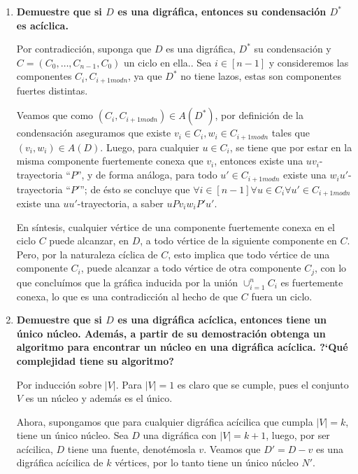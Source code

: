 \documentclass{article}
\begin{document}
\begin{enumerate}
  \item \textbf{Demuestre que si $D$ es una digr\'afica, entonces su
    condensaci\'on $D^\ast$ es ac\'iclica.}

    Por contradicci\'on, suponga que $D$ es una digr\'afica, $D^\ast$ su condensaci\'on y $C=(C_0,\dots,C_{n-1},C_0)$ un ciclo en ella.. Sea $i\in[n-1]$ y consideremos las componentes $C_i,C_{i+1 mod n}$, ya que $D^\ast$ no tiene lazos, estas son componentes fuertes distintas.

    Veamos que como $(C_i, C_{i+1 modn})\in A(D^\ast)$, por definici\'on de la condensaci\'on aseguramos que existe $v_i\in C_i, w_i\in C_{i+1 modn}$ tales que $(v_i,w_i)\in A(D)$. Luego, para cualquier $u\in C_i$, se tiene que por estar en la misma componente fuertemente conexa que $v_i$, entonces existe una $uv_i$-trayectoria ``$P$'', y de forma an\'aloga, para todo $u'\in C_{i+1 modn}$ existe una $w_iu'$-trayectoria ``$P'$''; de \'esto se concluye que $\forall i\in[n-1]\forall u\in C_i \forall u'\in C_{i+1 modn}$ existe una $uu'$-trayectoria, a saber $uPv_iw_iP'u'$.

  En s\'intesis, cualquier v\'ertice de una componente fuertemente conexa en el ciclo $C$ puede alcanzar, en $D$, a todo v\'ertice de la siguiente componente en $C$. Pero, por la naturaleza c\'iclica de $C$, esto implica que todo v\'ertice de una componente $C_i$, puede alcanzar a todo v\'ertice de otra componente $C_j$, con lo que conclu\'imos que la gr\'afica inducida por la uni\'on $\cup_{i=1}^nC_i$ es fuertemente conexa, lo que es una contradicci\'on al hecho de que $C$ fuera un ciclo.

  \item \textbf{Demuestre que si $D$ es una digr\'afica ac\'iclica, entonces
    tiene un \'unico n\'ucleo.   Adem\'as, a partir de su demostraci\'on
    obtenga un algoritmo para encontrar un n\'ucleo en una digr\'afica
    ac\'iclica.   ?`Qu\'e complejidad tiene su algoritmo?}

    Por inducci\'on sobre $|V|$. Para $|V|=1$ es claro que se cumple, pues el conjunto $V$ es un n\'ucleo y adem\'as es el \'unico.

    Ahora, supongamos que para cualquier digr\'afica ac\'icilica que cumpla $|V|=k$, tiene un \'unico n\'ucleo. Sea $D$ una digr\'afica con $|V|=k+1$, luego, por ser ac\'icilica, $D$ tiene una fuente, denot\'emosla $v$. Veamos que $D'=D-v$ es una digr\'afica ac\'icilica de $k$ v\'ertices, por lo tanto tiene un \'unico n\'ucleo $N'$.


\end{enumerate}
\end{document}
